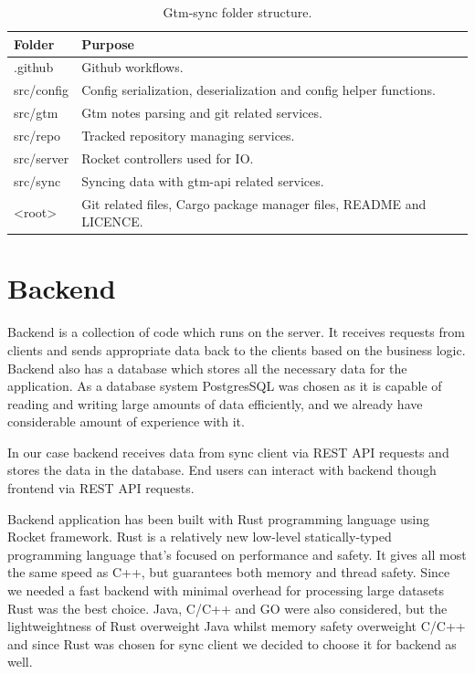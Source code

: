 \begin{table}[h]
    \centering
    \begin{tabular}{ | p{3cm} | p{10cm} |}
        \hline
        Folder & Purpose\\
        \hline
        .github & Github workflows.\\
        \hline
        src/config & Config serialization, deserialization and config helper functions.\\
        \hline
        src/gtm & Gtm notes parsing and git related services.\\
        \hline
        src/repo & Tracked repository managing services.\\
        \hline
        src/server & Rocket controllers used for IO.\\
        \hline
        src/sync & Syncing data with gtm-api related services.\\
        \hline
        <root> & Git related files, Cargo package manager files, README and LICENCE.\\
        \hline
    \end{tabular}
    \caption{Gtm-sync folder structure.}
    \label{tab:gtm-sync-folder-structure}
\end{table}

\section{Backend}\label{sec:backend}
Backend is a collection of code which runs on the server.
It receives requests from clients and sends appropriate data back to the clients based on the business logic.
Backend also has a database which stores all the necessary data for the application.
As a database system PostgresSQL was chosen as it is capable of reading and writing large amounts of data efficiently, and we already have considerable amount of experience with it.

In our case backend receives data from sync client via REST API requests and stores the data in the database.
End users can interact with backend though frontend via REST API requests.

Backend application has been built with Rust programming language using Rocket framework.
Rust is a relatively new low-level statically-typed programming language that's focused on performance and safety.
It gives all most the same speed as C++, but guarantees both memory and thread safety.
Since we needed a fast backend with minimal overhead for processing large datasets Rust was the best choice.
Java, C/C++ and GO were also considered, but the lightweightness of Rust overweight Java whilst memory safety overweight C/C++
and since Rust was chosen for sync client we decided to choose it for backend as well.

